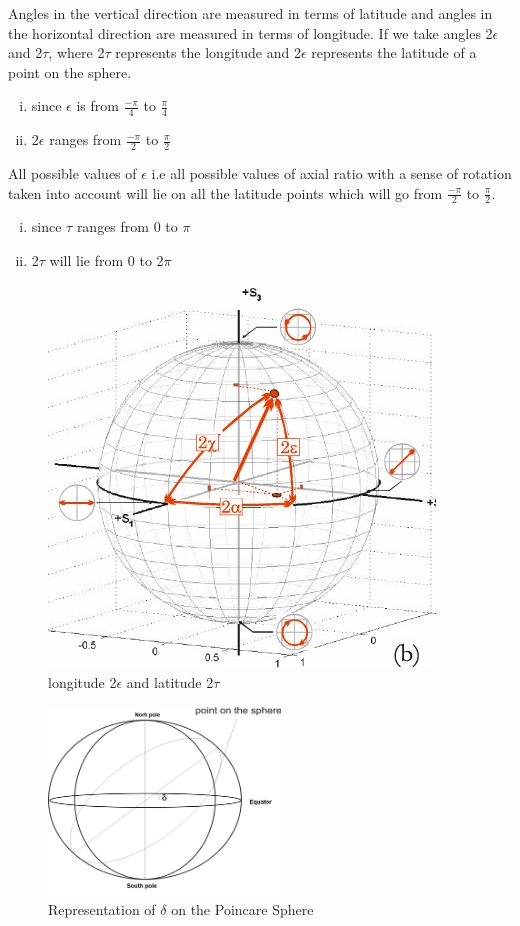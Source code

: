 Angles in the vertical direction are measured in terms of latitude and angles in the horizontal direction are measured in terms of longitude. If we take angles 2$\epsilon$ and 2$\tau$, where 2$\tau$ represents the longitude and 2$\epsilon$ represents the latitude of a point on the sphere.
\begin{enumerate}[(i)]
\item	since $\epsilon$ is from $\frac{-\pi}{4}$ to $\frac{\pi}{4}$
\item 	2$\epsilon$ ranges from $\frac{-\pi}{2}$ to $\frac{\pi}{2}$
\end{enumerate}
All possible values of $\epsilon$ i.e all possible values of axial ratio with a sense of rotation taken into account will lie on all the latitude points which will go from $\frac{-\pi}{2}$ to $\frac{\pi}{2}$. 
\begin{enumerate}[(i)]
\item 	since $\tau$ ranges from 0 to $\pi$
\item 	2$\tau$ will lie from 0 to 2$\pi$
\end{enumerate}
\begin{figure}[h]
\centering
\includegraphics[width=0.7\linewidth]{graphics/sphere}
\caption{longitude 2$\epsilon$ and latitude 2$\tau$}
\end{figure}
\begin{figure}[h]
\centering
\includegraphics[height=5cm]{graphics/SPHERE001}
\caption{Representation of $\delta$ on the Poincare Sphere}
\label{fig:sphere001}
\end{figure}

